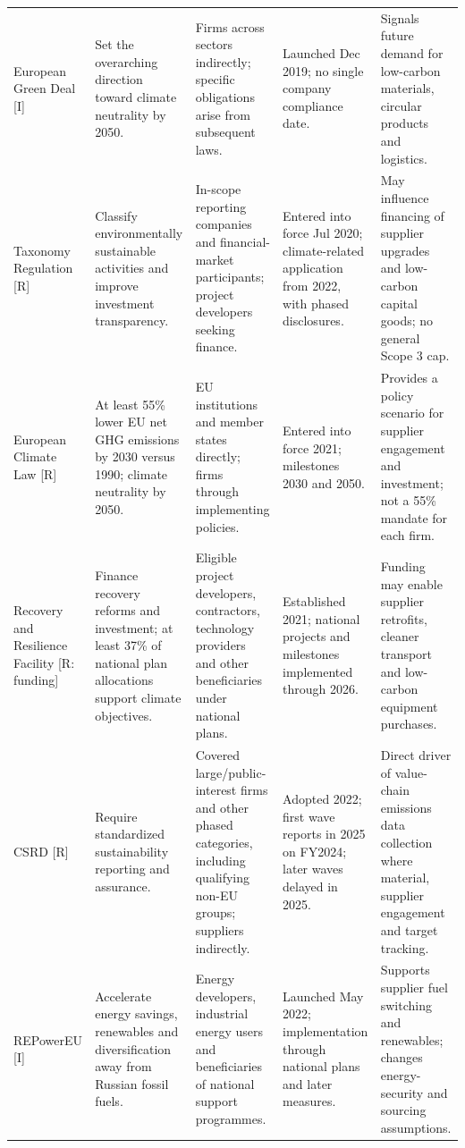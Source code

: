 \documentclass[10pt,a4paper,landscape]{article}
\begin{document}
\begin{tabularx}{\textwidth}{Y{0.85}Y{1.00}Y{0.85}Y{1.05}Y{1.25}}
\addlinespace[5pt]
European Green Deal [I]\cite{greendeal} & Set the overarching direction toward climate neutrality by 2050. & Firms across sectors indirectly; specific obligations arise from subsequent laws. & Launched Dec 2019; no single company compliance date. & Signals future demand for low-carbon materials, circular products and logistics. \\
\addlinespace[5pt]
Taxonomy Regulation [R]\cite{taxonomy} & Classify environmentally sustainable activities and improve investment transparency. & In-scope reporting companies and financial-market participants; project developers seeking finance. & Entered into force Jul 2020; climate-related application from 2022, with phased disclosures. & May influence financing of supplier upgrades and low-carbon capital goods; no general Scope 3 cap. \\
\addlinespace[5pt]
European Climate Law [R]\cite{climatelaw} & At least 55\% lower EU net GHG emissions by 2030 versus 1990; climate neutrality by 2050. & EU institutions and member states directly; firms through implementing policies. & Entered into force 2021; milestones 2030 and 2050. & Provides a policy scenario for supplier engagement and investment; not a 55\% mandate for each firm. \\
\addlinespace[5pt]
Recovery and Resilience Facility [R: funding]\cite{rrf} & Finance recovery reforms and investment; at least 37\% of national plan allocations support climate objectives. & Eligible project developers, contractors, technology providers and other beneficiaries under national plans. & Established 2021; national projects and milestones implemented through 2026. & Funding may enable supplier retrofits, cleaner transport and low-carbon equipment purchases. \\
\addlinespace[5pt]
CSRD [R]\cite{csrd,stopclock} & Require standardized sustainability reporting and assurance. & Covered large/public-interest firms and other phased categories, including qualifying non-EU groups; suppliers indirectly. & Adopted 2022; first wave reports in 2025 on FY2024; later waves delayed in 2025. & Direct driver of value-chain emissions data collection where material, supplier engagement and target tracking. \\
\addlinespace[5pt]
REPowerEU [I]\cite{repower} & Accelerate energy savings, renewables and diversification away from Russian fossil fuels. & Energy developers, industrial energy users and beneficiaries of national support programmes. & Launched May 2022; implementation through national plans and later measures. & Supports supplier fuel switching and renewables; changes energy-security and sourcing assumptions. \\

\end{tabularx}
\end{document}
